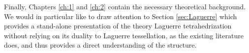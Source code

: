 Finally, Chapters \ref{ch:1} and \ref{ch:2} contain the necessary theoretical background. We would in particular like to draw attention to Section \ref{sec:Laguerre} which provides a stand-alone presentation of the theory Laguerre tetrahedrization without relying on its duality to Laguerre tessellation, as the existing literature does, and thus provides a direct understanding of the structure. 

